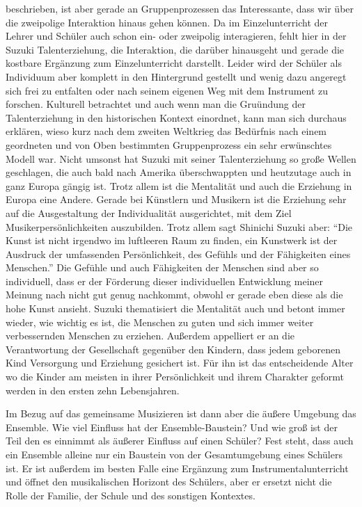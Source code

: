 beschrieben, ist aber gerade an Gruppenprozessen das Interessante, dass wir über
die zweipolige Interaktion hinaus gehen können. Da im Einzelunterricht der
Lehrer und Schüler auch schon ein- oder zweipolig interagieren, fehlt hier in
der Suzuki Talenterziehung, die Interaktion, die darüber hinausgeht und gerade
die kostbare Ergänzung zum Einzelunterricht darstellt. Leider wird der Schüler
als Individuum aber komplett in den Hintergrund gestellt und wenig dazu angeregt
sich frei zu entfalten oder nach seinem eigenen Weg mit dem Instrument zu
forschen. Kulturell betrachtet und auch wenn man die Gruündung der
Talenterziehung in den historischen Kontext einordnet, kann man sich durchaus
erklären, wieso kurz nach dem zweiten Weltkrieg das Bedürfnis nach einem
geordneten und von Oben bestimmten Gruppenprozess ein sehr erwünschtes Modell
war. Nicht umsonst hat Suzuki mit seiner Talenterziehung so große Wellen
geschlagen, die auch bald nach Amerika überschwappten und heutzutage auch in
ganz 
Europa gängig ist. Trotz allem ist die Mentalität und auch die Erziehung in
Europa eine Andere. Gerade bei Künstlern und Musikern ist die Erziehung sehr auf
die Ausgestaltung der Individualität ausgerichtet, mit dem Ziel
Musikerpersönlichkeiten auszubilden. Trotz allem sagt Shinichi Suzuki aber: \enquote{Die
Kunst ist nicht irgendwo im luftleeren Raum zu finden, ein Kunstwerk ist der
Ausdruck der umfassenden Persönlichkeit, des Gefühls und der Fähigkeiten eines
Menschen.} \autocite[103]{suzuki:erziehung_ist_liebe} Die Gefühle und auch
Fähigkeiten der Menschen sind aber so individuell, dass er der Förderung dieser
individuellen Entwicklung meiner Meinung nach nicht gut genug nachkommt, obwohl
er gerade eben diese als die hohe Kunst ansieht. Suzuki thematisiert die
Mentalität auch und betont immer wieder, wie wichtig es ist,
die Menschen zu guten und sich immer weiter verbessernden Menschen zu erziehen.
Außerdem appelliert er an die Verantwortung der Gesellschaft gegenüber den
Kindern, dass jedem geborenen Kind Versorgung und Erziehung gesichert ist.
\autocite[130]{suzuki:erziehung_ist_liebe} Für ihn ist das entscheidende
Alter wo die Kinder am meisten in ihrer Persönlichkeit und ihrem Charakter
geformt werden in den ersten zehn Lebensjahren. 


Im Bezug auf das gemeinsame Musizieren ist dann aber die äußere Umgebung das
Ensemble. Wie viel Einfluss hat der Ensemble-Baustein? Und wie groß ist der
Teil den es einnimmt als äußerer Einfluss auf einen Schüler? Fest steht, dass
auch ein Ensemble alleine nur ein Baustein von der Gesamtumgebung eines Schülers
ist. Er ist außerdem im besten Falle eine Ergänzung zum Instrumentalunterricht
und öffnet den musikalischen Horizont des Schülers, aber er ersetzt nicht die
Rolle der Familie, der Schule und des sonstigen Kontextes. 






